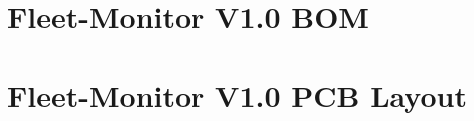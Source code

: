 \section{Fleet-Monitor V1.0 BOM} \label{Fleet-Monitor V1.0 BOM}
\enlargethispage{1.6cm}
\begin{adjustwidth}{-0.23cm}{0cm} \hfuzz=7.0pt \vfuzz=20.0pt
\end{adjustwidth}
\newpage


\section{Fleet-Monitor V1.0 PCB Layout} \label{Fleet-Monitor V1.0 PCB Layout}
\enlargethispage{2.5cm}
\begin{adjustwidth}{0.23cm}{0cm} \hfuzz=7.0pt \vfuzz=20.0pt
\end{adjustwidth}
\newpage

